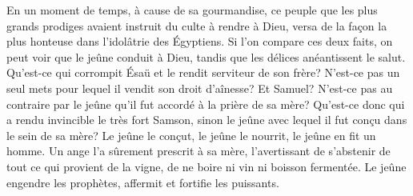 En un moment de temps, à cause de sa gourmandise,
	ce peuple
		que les plus grands prodiges avaient instruit du culte à rendre à Dieu,
	versa de la façon la plus honteuse dans l’idolâtrie des Égyptiens.
Si l’on compare ces deux faits, on peut voir que le jeûne conduit à Dieu,
	tandis que les délices anéantissent le salut.
Qu’est-ce qui corrompit Ésaü et le rendit serviteur de son frère?
	N’est-ce pas un seul mets pour lequel il vendit son droit d’aînesse?
Et Samuel? N’est-ce pas au contraire par le jeûne
	qu’il fut accordé à la prière de sa mère?
Qu’est-ce donc qui a rendu invincible le très fort Samson,
	sinon le jeûne avec lequel il fut conçu dans le sein de sa mère?
Le jeûne le conçut, le jeûne le nourrit, le jeûne en fit un homme.
Un ange l’a sûrement prescrit à sa mère,
	l’avertissant de s’abstenir de tout ce qui provient de la vigne,
	de ne boire ni vin ni boisson fermentée.
Le jeûne engendre les prophètes, affermit et fortifie les puissants.
